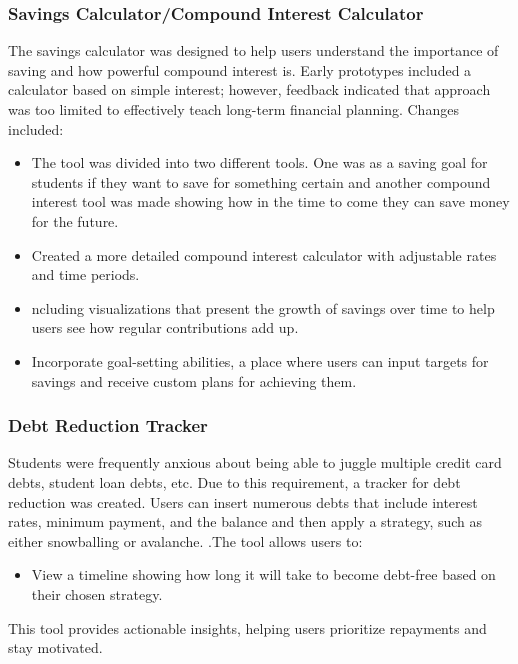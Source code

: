 \documentclass[11pt,twocolumn]{article}
\begin{document}
\subsubsection{Savings Calculator/Compound Interest Calculator}
The savings calculator was designed to help users understand the importance of saving and how powerful compound interest is. Early prototypes included a calculator based on simple interest; however, feedback indicated that approach was too limited to effectively teach long-term financial planning. Changes included:
\begin{itemize}
    \item The tool was divided into two different tools. One was as a saving goal for students if they want to save for something certain and another compound interest tool was made showing how in the time to come they can save money for the future.
    \item Created a more detailed compound interest calculator with adjustable rates and time periods.
    \item ncluding visualizations that present the growth of savings over time to help users see how regular contributions add up.
    \item Incorporate goal-setting abilities, a place where users can input targets for savings and receive custom plans for achieving them.
\end{itemize}

\subsubsection{Debt Reduction Tracker}
Students were frequently anxious about being able to juggle multiple credit card debts, student loan debts, etc. Due to this requirement, a tracker for debt reduction was created. Users can insert numerous debts that include interest rates, minimum payment, and the balance and then apply a strategy, such as either snowballing or avalanche.
.The tool allows users to:
\begin{itemize}
    \item View a timeline showing how long it will take to become debt-free based on their chosen strategy.
\end{itemize}

This tool provides actionable insights, helping users prioritize repayments and stay motivated.
\end{document}
